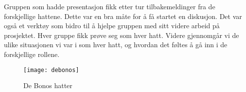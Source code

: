 





Gruppen som hadde presentasjon fikk etter tur tilbakemeldinger fra de
forskjellige hattene. Dette var en bra måte for å få startet en
diskusjon. Det var også et verktøy som bidro til å hjelpe gruppen med
sitt videre arbeid på prosjektet. Hver gruppe fikk prøve seg som hver
hatt. Videre gjennomgår vi de ulike situasjonen vi var i som hver hatt,
og hvordan det føltes å gå inn i de forskjellige rollene.
\begin{figure} [H]
		\begin{center}
			\texttt{[image: debonos]}
		\end{center}
	\caption{De Bonos hatter}
	\label{fig:hats}
\end{figure}
